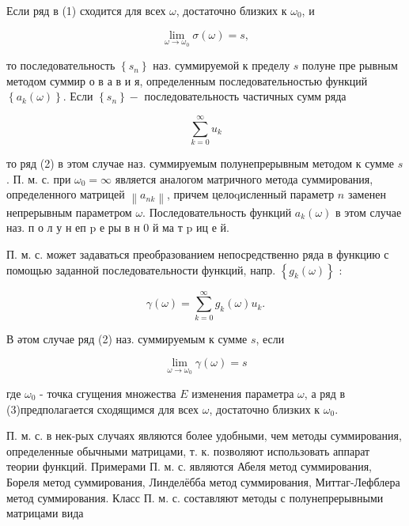 \documentclass[10pt]{article}
\begin{document}
Если ряд в (1) сходится для всех $\omega$, достаточно близких к $\omega_{0}$, и



\[

\lim _{\omega \rightarrow \omega_{0}} \sigma(\omega)=s,

\]



то последовательность $\left\{s_{n}\right\}$ наз. суммируемой к пределу $s$ полуне пре рывным методом суммир о в а в и я, определенным последовательностью функций $\left\{a_{k}(\omega)\right\}$. Если $\left\{s_{n}\right\}-$ последовательность частичных сумм ряда



\[

\sum_{k=0}^{\infty} u_{k}

\]



то ряд (2) в этом случае наз. суммируемым полунепрерывным методом к сумме $s$. П. м. с. при $\omega_{0}=\infty$ является аналогом матричного метода суммирования, определенного матрицей $\left\|a_{n k}\right\|$, причем целоqисленный параметр $n$ заменен непрерывным параметром $\omega$. Последовательность функций $a_{k}(\omega)$ в этом случае наз. п о л у н еп $\mathrm{p}$ е ры в н 0 й ма т $\mathrm{p}$ иц е й.



П. м. с. может задаваться преобразованием непосредственно ряда в функцию с помощью заданной последовательности функций, напр. $\left\{g_{k}(\omega)\right\}$ :



\[

\gamma(\omega)=\sum_{k=0}^{\infty} g_{k}(\omega) u_{k} .

\]



В әтом случае ряд (2) наз. суммируемым к сумме $s$, если



\[

\lim _{\omega \rightarrow \omega_{0}} \gamma(\omega)=s

\]



где $\omega_{0}$ - точка сгущения множества $E$ изменения параметра $\omega$, а ряд в (3)предполагается сходящимся для всех $\omega$, достаточно близких к $\omega_{0}$.



П. м. с. в нек-рых случаях являются более удобными, чем методы суммирования, определенные обычными матрицами, т. к. позволяют использовать аппарат теории функций. Примерами П. м. с. являются Абеля метод суммирования, Бореля метод суммирования, Линделёбба метод суммирования, Миттаг-Лефблера метод суммирования. Класс П. м. с. составляют методы с полунепрерывными матрицами вида
\end{document}
